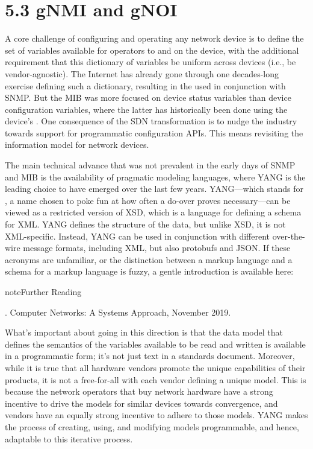 \documentclass[letterpaper,11pt,english]{sphinxmanual}
\begin{document}
\section{5.3 gNMI and gNOI}
\label{\detokenize{stratum:gnmi-and-gnoi}}
A core challenge of configuring and operating any network device is to
define the set of variables available for operators to  and
 on the device, with the additional requirement that this
dictionary of variables be uniform across devices (i.e., be
vendor-agnostic). The Internet has already gone through one
decades-long exercise defining such a dictionary, resulting in the
 used in conjunction with SNMP. But
the MIB was more focused on  device status variables than
 device configuration variables, where the latter has
historically been done using the device’s . One consequence of the SDN transformation is to nudge the
industry towards support for programmatic configuration APIs. This
means revisiting the information model for network devices.

The main technical advance that was not prevalent in the early days of
SNMP and MIB is the availability of pragmatic modeling languages,
where YANG is the leading choice to have emerged over the last few
years. YANG—which stands for , a name
chosen to poke fun at how often a do-over proves necessary—can be
viewed as a restricted version of XSD, which is a language for
defining a schema for XML. YANG defines the structure of the data, but
unlike XSD, it is not XML-specific. Instead, YANG can be used in
conjunction with different over-the-wire message formats, including
XML, but also protobufs and JSON. If these acronyms are unfamiliar, or
the distinction between a markup language and a schema for a markup
language is fuzzy, a gentle introduction is available here:

\label{\detokenize{stratum:reading-xml}}
\begin{sphinxadmonition}{note}{Further Reading}

.
Computer Networks: A Systems Approach, November 2019.
\end{sphinxadmonition}

What’s important about going in this direction is that the data model
that defines the semantics of the variables available to be read and
written is available in a programmatic form; it’s not just text in a
standards document. Moreover, while it is true that all hardware
vendors promote the unique capabilities of their products, it is not a
free-for-all with each vendor defining a unique model. This is because
the network operators that buy network hardware have a strong
incentive to drive the models for similar devices towards convergence,
and vendors have an equally strong incentive to adhere to those
models. YANG makes the process of creating, using, and modifying
models programmable, and hence, adaptable to this iterative process.
\end{document}

